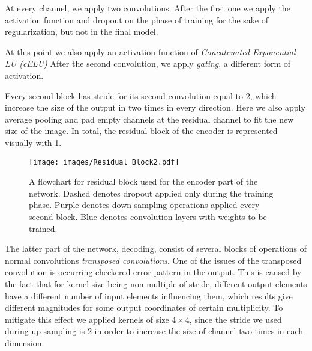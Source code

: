 At every channel, we apply two convolutions.
After the first one we apply the activation function and dropout on the phase of training for the sake of regularization, but not in the final model.
\medskip

At this point we also apply an activation function of \emph{Concatenated Exponential LU (cELU)}
After the second convolution, we apply \emph{gating}, a different form of activation.
\medskip

Every second block has stride for its second convolution equal to 2, which increase the size of the output in two times in every direction.
Here we also apply average pooling and pad empty channels at the residual channel to fit the new size of the image.
In total, the residual block of the encoder is represented visually with \ref{fig:res_block}.
\begin{figure}[h]
	\centering
	\texttt{[image: images/Residual\_Block2.pdf]}
	\label{fig:res_block}
	\caption{A flowchart for residual block used for the encoder part of the network. Dashed denotes dropout applied only during the training phase. Purple denotes down-sampling operations applied every second block. Blue denotes convolution layers with weights to be trained.}
\end{figure}
\medskip

The latter part of the network, decoding, consist of several blocks of operations of normal convolutions \emph{transposed convolutions}.
One of the issues of the transposed convolution is occurring checkered error pattern in the output.
This is caused by the fact that for kernel size being non-multiple of stride, different output elements have a different number of input elements influencing them, which results give different magnitudes for some output coordinates of certain multiplicity.
To mitigate this effect we applied kernels of size $4 \times 4$, since the stride we used during up-sampling is $2$ in order to increase the size of channel two times in each dimension.
\medskip

